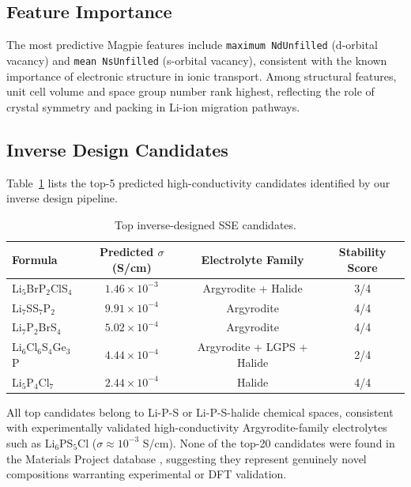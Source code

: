 \documentclass[12pt]{article}
\begin{document}
\subsection{Feature Importance}

The most predictive Magpie features include \texttt{maximum NdUnfilled}
(d-orbital vacancy) and \texttt{mean NsUnfilled} (s-orbital vacancy), consistent
with the known importance of electronic structure in ionic transport. Among structural
features, unit cell volume and space group number rank highest, reflecting the role
of crystal symmetry and packing in Li-ion migration pathways.

\subsection{Inverse Design Candidates}

Table~\ref{tab:candidates} lists the top-5 predicted high-conductivity candidates
identified by our inverse design pipeline.

\begin{table}[h]
\centering
\caption{Top inverse-designed SSE candidates.}
\label{tab:candidates}
\begin{tabular}{lccc}
\toprule
Formula & Predicted $\sigma$ (S/cm) & Electrolyte Family & Stability Score \\
\midrule
Li$_5$BrP$_2$ClS$_4$   & $1.46 \times 10^{-3}$ & Argyrodite + Halide & 3/4 \\
Li$_7$SS$_7$P$_2$       & $9.91 \times 10^{-4}$ & Argyrodite          & 4/4 \\
Li$_7$P$_2$BrS$_4$      & $5.02 \times 10^{-4}$ & Argyrodite          & 4/4 \\
Li$_6$Cl$_6$S$_4$Ge$_3$P & $4.44 \times 10^{-4}$ & Argyrodite + LGPS + Halide & 2/4 \\
Li$_5$P$_4$Cl$_7$        & $2.44 \times 10^{-4}$ & Halide              & 4/4 \\
\bottomrule
\end{tabular}
\end{table}

All top candidates belong to Li-P-S or Li-P-S-halide chemical spaces, consistent
with experimentally validated high-conductivity Argyrodite-family electrolytes such
as Li$_6$PS$_5$Cl ($\sigma \approx 10^{-3}$ S/cm). None of the top-20 candidates
were found in the Materials Project database \cite{jain2013mp}, suggesting they
represent genuinely novel compositions warranting experimental or DFT validation.
\end{document}
